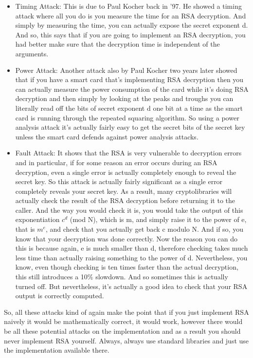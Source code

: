 \documentclass[11pt]{article}
\begin{document}
\begin{itemize}
\item
  Timing Attack: This is due to Paul Kocher back in '97. He showed a
  timing attack where all you do is you measure the time for an RSA
  decryption. And simply by measuring the time, you can actually expose
  the secret exponent d. And so, this says that if you are going to
  implement an RSA decryption, you had better make sure that the
  decryption time is independent of the arguments. 
\item
  Power Attack: Another attack also by Paul Kocher two years later
  showed that if you have a smart card that's implementing RSA
  decryption then you can actually measure the power consumption of the
  card while it's doing RSA decryption and then simply by looking at the
  peaks and troughs you can literally read off the bits of secret
  exponent d one bit at a time as the smart card is running through the
  repeated squaring algorithm. So using a power analysis attack it's
  actually fairly easy to get the secret bits of the secret key unless
  the smart card defends against power analysis attacks. 
\item
  Fault Attack: It shows that the RSA is very vulnerable to decryption
  errors and in particular, if for some reason an error occurs during an
  RSA decryption, even a single error is actually completely enough to
  reveal the secret key. So this attack is actually fairly significant
  as a single error completely reveals your secret key. As a result,
  many cryptolibraries will actually check the result of the RSA
  decryption before returning it to the caller. And the way you would
  check it is, you would take the output of this exponentiation
  \(c^{d}\) (mod N), which is m, and simply raise it to the power of e,
  that is \(m^{e}\), and check that you actually get back c modulo N.
  And if so, you know that your decryption was done correctly. Now the
  reason you can do this is because again, e is much smaller than d,
  therefore checking takes much less time than actually raising
  something to the power of d. Nevertheless, you know, even though
  checking is ten times faster than the actual decryption, this still
  introduces a 10\% slowdown. And so sometimes this is actually turned
  off. But nevertheless, it's actually a good idea to check that your
  RSA output is correctly computed.
\end{itemize}

So, all these attacks kind of again make the point that if you just
implement RSA naively it would be mathematically correct, it would work,
however there would be all these potential attacks on the implementation
and as a result you should never implement RSA yourself. Always, always
use standard libraries and just use the implementation available there.
\end{document}
